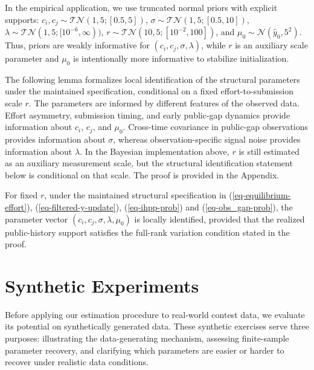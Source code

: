 \documentclass[mnsc]{informs3}
\begin{document}
In the empirical application, we use truncated normal priors with explicit supports:
$c_i,c_j\sim\mathcal{TN}(1,5;[0.5,5])$,
$\sigma\sim\mathcal{TN}(1,5;[0.5,10])$,
$\lambda\sim\mathcal{TN}(1,5;[10^{-6},\infty))$,
$r\sim\mathcal{TN}(10,5;[10^{-2},100])$,
and $\mu_0\sim\mathcal{N}(\hat{y}_0,5^2)$.
Thus, priors are weakly informative for $(c_i,c_j,\sigma,\lambda)$, while $r$ is an auxiliary scale parameter and $\mu_0$ is intentionally more informative to stabilize initialization.


The following lemma formalizes local identification of the structural parameters under the maintained specification, conditional on a fixed effort-to-submission scale $r$.
The parameters are informed by different features of the observed data. Effort asymmetry, submission timing, and early public-gap dynamics provide information about \(c_i\), \(c_j\), and \(\mu_0\). Cross-time covariance in public-gap observations provides information about \(\sigma\), whereas observation-specific signal noise provides information about \(\lambda\).
In the Bayesian implementation above, $r$ is still estimated as an auxiliary measurement scale, but the structural identification statement below is conditional on that scale.
The proof is provided in the Appendix.

\begin{lemma}
\label{lmm-params-identifiability}
For fixed $r$, under the maintained structural specification in (\ref{eq-equilibrium-effort}), (\ref{eq-filtered-y-update}), (\ref{eq-ihpp-prob}) and (\ref{eq-obs_gap-prob}), the parameter vector $(c_i,c_j,\sigma,\lambda,\mu_0)$ is locally identified, provided that the realized public-history support satisfies the full-rank variation condition stated in the proof.
\end{lemma}


\section{Synthetic Experiments}\label{sect-synthetic}

Before applying our estimation procedure to real-world contest data, we evaluate its potential on synthetically generated data.
These synthetic exercises serve three purposes: illustrating the data-generating mechanism, assessing finite-sample parameter recovery, and clarifying which parameters are easier or harder to recover under realistic data conditions.
\end{document}
